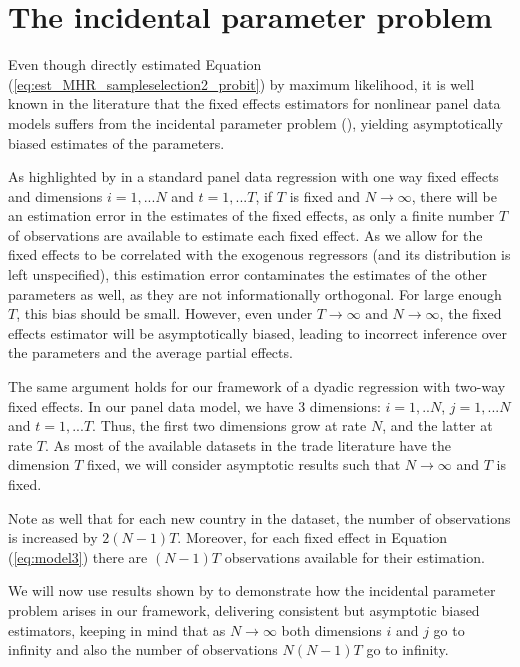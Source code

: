 \section{The incidental parameter problem} \label{section_incidental_parameters}
Even though \cite{helpman2008estimating} directly estimated Equation (\ref{eq:est_MHR_sampleselection2_probit}) by maximum likelihood, it is well known in the literature that the fixed effects estimators for nonlinear panel data models suffers from the incidental parameter problem (\cite{neyman1948consistent}), yielding asymptotically biased estimates of the parameters.

As highlighted by \cite{arellano2007understanding} in a standard panel data regression with one way fixed effects and dimensions $i=1,...N$ and $t=1,...T$, if $T$ is fixed and $N \xrightarrow{} \infty$, there will be an estimation error in the estimates of the fixed effects, as only a finite number $T$ of observations are available to estimate each fixed effect. As we allow for the fixed effects to be correlated with the exogenous regressors (and its distribution is left unspecified), this estimation error contaminates the estimates of the other parameters as well, as they are not informationally orthogonal. For large enough $T$, this bias should be small. However, even under $T \xrightarrow{} \infty$ and  $N \xrightarrow{} \infty$, the fixed effects estimator will be asymptotically biased, leading to incorrect inference over the parameters and the average partial effects.

The same argument holds for our framework of a dyadic regression with two-way fixed effects. In our panel data model, we have 3 dimensions: $i=1,..N$, $j=1,...N$ and $t=1,...T$. Thus, the first two dimensions grow at rate $N$, and the latter at rate $T$. As most of the available datasets in the trade literature have the dimension $T$ fixed, we will consider asymptotic results such that $N \xrightarrow{} \infty$ and $T$ is fixed. 

Note as well that for each new country in the dataset, the number of observations is increased by $2(N-1)T$. Moreover, for each fixed effect in Equation (\ref{eq:model3}) there are $(N-1)T$ observations available for their estimation. 

We will now use results shown by \cite{fernandez2016individual} to demonstrate how the incidental parameter problem arises in our framework, delivering consistent but asymptotic biased estimators, keeping in mind that as $N \xrightarrow{} \infty$ both dimensions $i$ and $j$ go to infinity and also the number of observations $N(N-1)T$ go to infinity.

